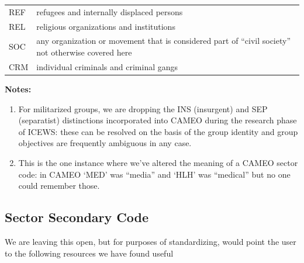 \documentclass[11pt]{report}
\begin{document}
\begin{center}
\begin{longtable}{|l|p{13cm}|}
      REF & refugees and internally displaced persons \\
      REL & religious organizations and institutions \\ 
      SOC & any organization or movement that is considered part of ``civil society''  not otherwise covered here\\
      CRM & individual criminals and criminal gangs \\
  \hline
\end{longtable}
\noindent \raggedright{\textbf{Notes:}}
\begin{enumerate}
\item For militarized groups, we are dropping the INS (insurgent) and SEP (separatist) distinctions incorporated into CAMEO during the research phase of ICEWS: these can be resolved on the basis of the group identity and group objectives are frequently ambiguous in any case. 
\item This is the one instance where we've altered the meaning of a CAMEO sector code: in CAMEO `MED' was ``media'' and `HLH' was ``medical'' but no one could remember those.
\end{enumerate}
\end{center}


\subsection{Sector Secondary Code}

We are leaving this open, but for purposes of standardizing, would point the user to the following resources we have found useful
\end{document}
